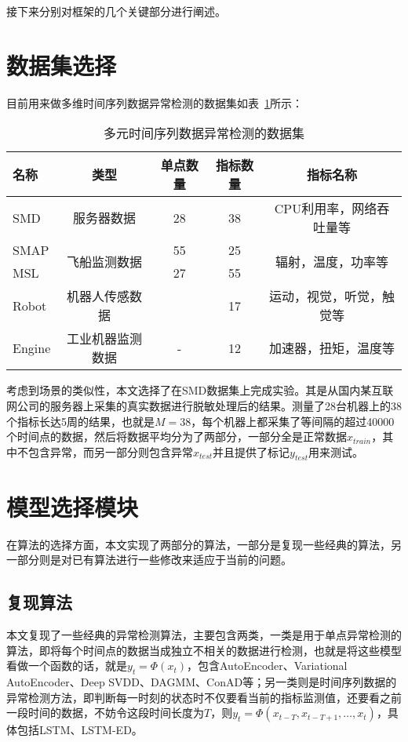 接下来分别对框架的几个关键部分进行阐述。
\section{数据集选择}
目前用来做多维时间序列数据异常检测的数据集如表~\ref{tab:dataset}所示：

\begin{table}[htbp]
  \centering
  \begin{tabular}{lcccc}
    \toprule
    名称 & 类型 & 单点数量 & 指标数量  & 指标名称 \\
    \midrule
    SMD\cite{su2019robust} & 服务器数据 & 28 & 38 & CPU利用率，网络吞吐量等\\
    SMAP\cite{DBLP:conf/kdd/HundmanCLCS18} & \multirow{2}{*}{飞船监测数据} & 55 & 25 & \multirow{2}{*}{辐射，温度，功率等}\\
    MSL\cite{DBLP:conf/kdd/HundmanCLCS18} &  & 27 & 55 &  \\
    Robot\cite{park2018multimodal} & 机器人传感数据 & \approx 39 & 17 & 运动，视觉，听觉，触觉等\\
    Engine\cite{malhotra2016lstm} &工业机器监测数据 & - & 12 & 加速器，扭矩，温度等\\
    \bottomrule
  \end{tabular}
  \caption{多元时间序列数据异常检测的数据集\cite{su2019robust}}
  \label{tab:dataset}
\end{table}

考虑到场景的类似性，本文选择了在SMD\cite{su2019robust}数据集上完成实验。其是从国内某互联网公司的服务器上采集的真实数据进行脱敏处理后的结果。测量了28台机器上的38个指标长达5周的结果，也就是$M=38$，每个机器上都采集了等间隔的超过40000个时间点的数据，然后将数据平均分为了两部分，一部分全是正常数据$x_{train}$，其中不包含异常，而另一部分则包含异常$x_{test}$并且提供了标记$y_{test}$用来测试。

\section{模型选择模块}
\label{sec:model:select}
在算法的选择方面，本文实现了两部分的算法，一部分是复现一些经典的算法，另一部分则是对已有算法进行一些修改来适应于当前的问题。
\subsection{复现算法}
本文复现了一些经典的异常检测算法，主要包含两类，一类是用于单点异常检测的算法，即将每个时间点的数据当成独立不相关的数据进行检测，也就是将这些模型看做一个函数的话，就是$y_t = \Phi (x_t)$，包含AutoEncoder、Variational AutoEncoder\cite{an2015variational}、Deep SVDD\cite{ruff2018deep}、DAGMM\cite{zong2018deep}、ConAD\cite{nguyen2018anomaly}等；另一类则是时间序列数据的异常检测方法，即判断每一时刻的状态时不仅要看当前的指标监测值，还要看之前一段时间的数据，不妨令这段时间长度为$T$，则$y_t = \Phi(x_{t-T},x_{t-T+1},\dots,x_{t})$，具体包括LSTM、LSTM-ED\cite{malhotra2016lstm}。

